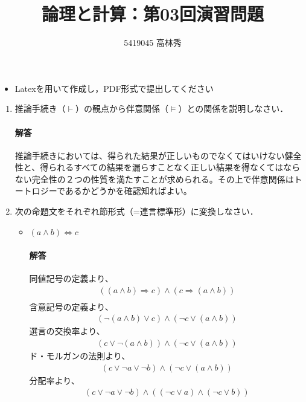 \documentclass[dvipdfmx]{jsarticle}
\def\NO{03}
\def\LECTURENAME{論理と計算}
\begin{document}
\title{\LECTURENAME{}：第\NO{}回演習問題}

\author{5419045 高林秀}

\date{}
\maketitle

\begin{itemize}
\item Latexを用いて作成し，PDF形式で提出してください
\end{itemize}


\vspace*{\baselineskip}

\begin{enumerate}\setlength{\itemsep}{\baselineskip}
\item 推論手続き（$\vdash$）の観点から伴意関係（$\models$）との関係を説明しなさい．
\paragraph{解答}\par
推論手続きにおいては、得られた結果が正しいものでなくてはいけない健全性と、得られるすべての結果を漏らすことなく正しい結果を得なくてはならない完全性の２つの性質を満たすことが求められる。その上で伴意関係はトートロジーであるかどうかを確認知ればよい。


\item 次の命題文をそれぞれ節形式（=連言標準形）に変換しなさい．
  \begin{itemize}
  \item $(a\land b)\Leftrightarrow c$
  \paragraph{解答}\par
  同値記号の定義より、
  \begin{align*}
    ((a \wedge b) \Rightarrow c) \wedge (c \Rightarrow(a\wedge b)) \\
  \end{align*}
  含意記号の定義より、
  \begin{align*}
    (\neg (a \wedge b) \vee c) \wedge (\neg c \vee (a \wedge b))
  \end{align*}
  選言の交換率より、
  \begin{align*}
    (c \vee \neg(a \wedge b)) \wedge (\neg c \vee (a \wedge b))
  \end{align*}
  ド・モルガンの法則より、
  \begin{align*}
    (c \vee \neg a \vee \neg b) \wedge (\neg c \vee (a \wedge b))
  \end{align*}
  分配率より、
  \begin{align*}
    (c \vee \neg a \vee \neg b) \wedge ((\neg c \vee a)\wedge (\neg c \vee b))
  \end{align*}


\end{itemize}
\end{enumerate}
\end{document}
